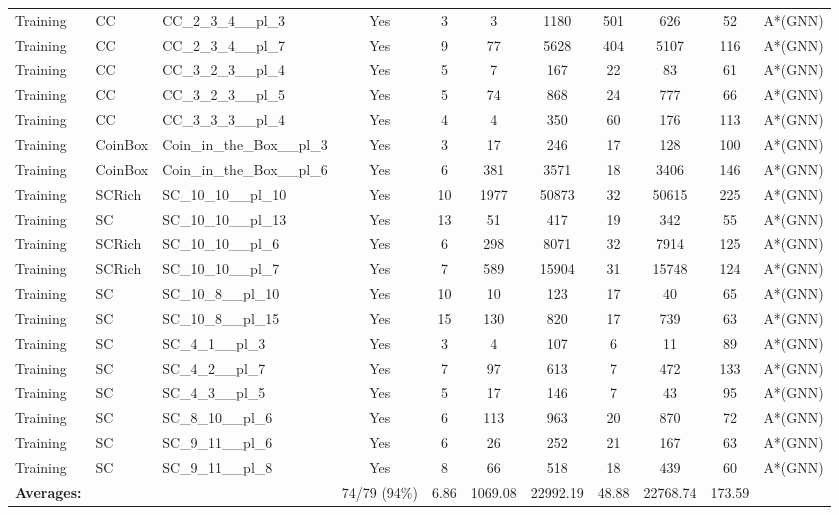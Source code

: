 \documentclass{article}
\begin{document}
\begin{tabular}{lllcccccccc}
Training & CC & CC\_2\_3\_4\_\_pl\_3 & Yes & 3 & 3 & 1180 & 501 & 626 & 52 & A*(GNN) \\
Training & CC & CC\_2\_3\_4\_\_pl\_7 & Yes & 9 & 77 & 5628 & 404 & 5107 & 116 & A*(GNN) \\
Training & CC & CC\_3\_2\_3\_\_pl\_4 & Yes & 5 & 7 & 167 & 22 & 83 & 61 & A*(GNN) \\
Training & CC & CC\_3\_2\_3\_\_pl\_5 & Yes & 5 & 74 & 868 & 24 & 777 & 66 & A*(GNN) \\
Training & CC & CC\_3\_3\_3\_\_pl\_4 & Yes & 4 & 4 & 350 & 60 & 176 & 113 & A*(GNN) \\
Training & CoinBox & Coin\_in\_the\_Box\_\_pl\_3 & Yes & 3 & 17 & 246 & 17 & 128 & 100 & A*(GNN) \\
Training & CoinBox & Coin\_in\_the\_Box\_\_pl\_6 & Yes & 6 & 381 & 3571 & 18 & 3406 & 146 & A*(GNN) \\
Training & SCRich & SC\_10\_10\_\_pl\_10 & Yes & 10 & 1977 & 50873 & 32 & 50615 & 225 & A*(GNN) \\
Training & SC & SC\_10\_10\_\_pl\_13 & Yes & 13 & 51 & 417 & 19 & 342 & 55 & A*(GNN) \\
Training & SCRich & SC\_10\_10\_\_pl\_6 & Yes & 6 & 298 & 8071 & 32 & 7914 & 125 & A*(GNN) \\
Training & SCRich & SC\_10\_10\_\_pl\_7 & Yes & 7 & 589 & 15904 & 31 & 15748 & 124 & A*(GNN) \\
Training & SC & SC\_10\_8\_\_pl\_10 & Yes & 10 & 10 & 123 & 17 & 40 & 65 & A*(GNN) \\
Training & SC & SC\_10\_8\_\_pl\_15 & Yes & 15 & 130 & 820 & 17 & 739 & 63 & A*(GNN) \\
Training & SC & SC\_4\_1\_\_pl\_3 & Yes & 3 & 4 & 107 & 6 & 11 & 89 & A*(GNN) \\
Training & SC & SC\_4\_2\_\_pl\_7 & Yes & 7 & 97 & 613 & 7 & 472 & 133 & A*(GNN) \\
Training & SC & SC\_4\_3\_\_pl\_5 & Yes & 5 & 17 & 146 & 7 & 43 & 95 & A*(GNN) \\
Training & SC & SC\_8\_10\_\_pl\_6 & Yes & 6 & 113 & 963 & 20 & 870 & 72 & A*(GNN) \\
Training & SC & SC\_9\_11\_\_pl\_6 & Yes & 6 & 26 & 252 & 21 & 167 & 63 & A*(GNN) \\
Training & SC & SC\_9\_11\_\_pl\_8 & Yes & 8 & 66 & 518 & 18 & 439 & 60 & A*(GNN) \\
\textbf{Averages:} & & & 74/79 (94\%) & 6.86 & 1069.08 & 22992.19 & 48.88 & 22768.74 & 173.59 & \\
\bottomrule
\end{tabular}
\newpage
\end{document}
